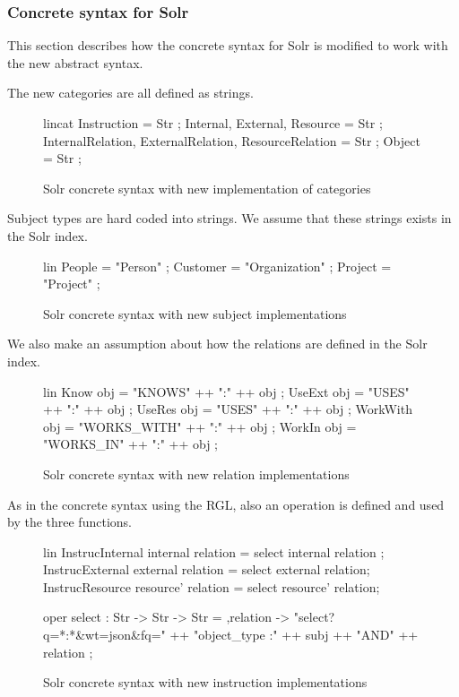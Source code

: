 \subsubsection*{Concrete syntax for Solr}
This section describes how the concrete syntax for Solr is modified to work with the new abstract syntax.

The new categories are all defined as strings.

\begin{figure}[H]
\begin{code}
lincat
  Instruction = Str ;
  Internal, External, Resource = Str ;
  InternalRelation, ExternalRelation, ResourceRelation = Str ;
  Object = Str ;
\end{code}
\caption{Solr concrete syntax with new implementation of categories\label{fig:solr-categories-impl}}
\end{figure}

Subject types are hard coded into strings. We assume that these strings exists in the Solr index.

\begin{figure}[H]
\begin{code}
lin
  People = "Person" ;
  Customer = "Organization" ;
  Project = "Project" ;
\end{code}
\caption{Solr concrete syntax with new subject implementations\label{fig:solr-function-implementation}}
\end{figure}

We also make an assumption about how the relations are defined in the Solr index. 

\begin{figure}[H]
\begin{code}
lin
  Know obj = "KNOWS" ++ ":" ++ obj ;
  UseExt obj = "USES" ++ ":" ++ obj ;
  UseRes obj = "USES" ++ ":" ++ obj ;
  WorkWith obj = "WORKS_WITH" ++ ":" ++ obj ;
  WorkIn obj = "WORKS_IN" ++ ":" ++ obj ;
\end{code}
\caption{Solr concrete syntax with new relation implementations\label{fig:solr-new-relations}}
\end{figure}

As in the concrete syntax using the RGL, also an operation is defined and used by the three functions.

\begin{figure}[H]
\begin{code}
lin
  InstrucInternal internal relation = select internal relation ;
  InstrucExternal external relation = select external relation;
  InstrucResource resource' relation = select resource' relation;

oper
  select : Str -> Str -> Str = \subj,relation -> 
                    "select?q=*:*&wt=json&fq=" ++ "object_type :" 
                    ++ subj ++ "AND" ++ relation ;
\end{code}
\caption{Solr concrete syntax with new instruction implementations\label{fig:solr-new-instructions}}
\end{figure}

